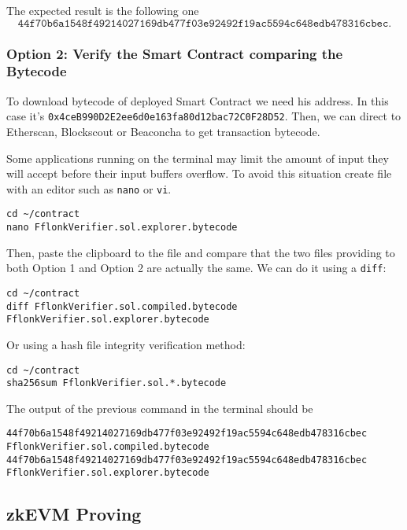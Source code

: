 The expected result is the following one
\[
\texttt{44f70b6a1548f49214027169db477f03e92492f19ac5594c648edb478316cbec.}
\]


\subsubsection{Option 2: Verify the Smart Contract comparing the Bytecode}

To download bytecode of deployed Smart Contract we need his address. In this case it’s \texttt{0x4ceB990D2E2ee6d0e163fa80d12bac72C0F28D52}. Then, we can direct to Etherscan, Blockscout or Beaconcha to get transaction bytecode.

Some applications running on the terminal may limit the amount of input they will accept before their input buffers overflow. To avoid this situation create file  with an editor such as \texttt{nano} or \texttt{vi}.

\begin{lstlisting}[style=termt]
cd ~/contract
nano FflonkVerifier.sol.explorer.bytecode
\end{lstlisting}

Then, paste the clipboard to the file and compare that the two files providing to both Option 1 and Option 2 are actually the same. We can do it using a \texttt{diff}:

\begin{lstlisting}[style=termt]
cd ~/contract
diff FflonkVerifier.sol.compiled.bytecode FflonkVerifier.sol.explorer.bytecode
\end{lstlisting}


Or using a hash file integrity verification method:

\begin{lstlisting}[style=termt]
cd ~/contract
sha256sum FflonkVerifier.sol.*.bytecode
\end{lstlisting}

The output of the previous command in the terminal should be

\begin{lstlisting}[style=termt]
44f70b6a1548f49214027169db477f03e92492f19ac5594c648edb478316cbec  FflonkVerifier.sol.compiled.bytecode
44f70b6a1548f49214027169db477f03e92492f19ac5594c648edb478316cbec  FflonkVerifier.sol.explorer.bytecode
\end{lstlisting}


\subsection{zkEVM Proving}


